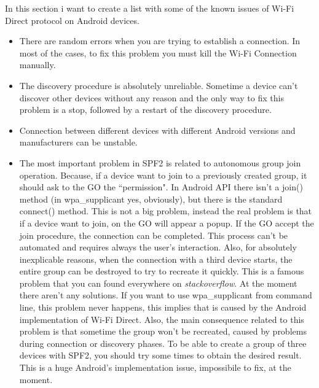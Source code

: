In this section i want to create a list with some of the known issues of Wi-Fi Direct protocol on Android devices.
\begin{itemize}
	\item There are random errors when you are trying to establish a connection. In most of the cases, to fix this problem you must kill the Wi-Fi Connection manually.
	\item The discovery procedure is absolutely unreliable. Sometime a device can't discover other devices without any reason and the only way to fix this problem is a stop, followed by a restart of the discovery procedure.
	\item Connection between different devices with different Android versions and manufacturers can be unstable.
	\item The most important problem in SPF2 is related to autonomous group join operation. Because, if a device want to join to a previously created group, it should ask to the GO the ``permission". In Android API there isn't a \textsf{join()} method (in wpa\_supplicant yes, obviously), but there is the standard \textsf{connect()} method. This is not a big problem, instead the real problem is that if a device want to join, on the GO will appear a popup. If the GO accept the join procedure, the connection can be completed. This process can't be automated and requires always the user's interaction. Also, for absolutely inexplicable reasons, when the connection with a third device starts, the entire group can be destroyed to try to recreate it quickly. This is a famous problem that you can found everywhere on \emph{stackoverflow}. At the moment there aren't any solutions. If you want to use wpa\_supplicant from command line, this problem never happens, this implies that is caused by the Android implementation of Wi-Fi Direct. Also, the main consequence related to this problem is that sometime the group won't be recreated, caused by problems during connection or discovery phases. To be able to create a group of three devices with SPF2, you should try some times to obtain the desired result. This is a huge Android's implementation issue, impossibile to fix, at the moment.
\end{itemize}


